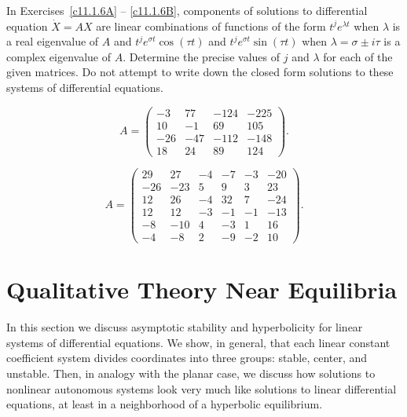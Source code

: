 \documentclass{ximera}
\begin{document}
In Exercises~\ref{c11.1.6A} -- \ref{c11.1.6B}, components of solutions to 
differential equation $\dot{X}=AX$ are linear combinations of functions of 
the form $t^je^{\lambda t}$ when $\lambda$ is a real eigenvalue of $A$ and 
$t^je^{\sigma t}\cos(\tau t)$ and $t^je^{\sigma t}\sin(\tau t)$ when
$\lambda=\sigma\pm i\tau$ is a complex eigenvalue of $A$.  Determine the
precise values of $j$ and $\lambda$ for each of the given matrices.  Do not
attempt to write down the closed form solutions to these systems of
differential equations.
\begin{exercise} \label{c11.1.6A}
\begin{equation*}
A=\left(\begin{array}{rrrr}  
   -3 &  77 & -124 & -225 \\
   10 &  -1 &   69 &  105 \\
  -26 & -47 & -112 & -148 \\
   18 &  24 &   89 &  124 \end{array} \right).
\end{equation*}
\end{exercise}
\begin{exercise} \label{c11.1.6B}
\begin{equation*}
A=\left(\begin{array}{rrrrrr}  
   29 &  27 &  -4 &  -7 &  -3 & -20 \\
  -26 & -23 &   5 &   9 &   3 &  23 \\
   12 &  26 &  -4 &  32 &   7 & -24 \\
   12 &  12 &  -3 &  -1 &  -1 & -13 \\
   -8 & -10 &   4 &  -3 &   1 &  16 \\
   -4 &  -8 &   2 &  -9 &  -2 &  10  \end{array} \right).
\end{equation*}
\end{exercise}



 
\section{Qualitative Theory Near Equilibria}
\label{S:QT}


In this section we discuss asymptotic stability and hyperbolicity for 
linear systems of differential equations.  We show, in general, that 
each linear constant coefficient system divides coordinates into three
groups: stable, center, and unstable.   Then, in analogy with the 
planar case, we discuss how solutions to nonlinear autonomous systems 
look very much like solutions to linear differential equations, at least
in a neighborhood of a hyperbolic equilibrium.
\end{document}
